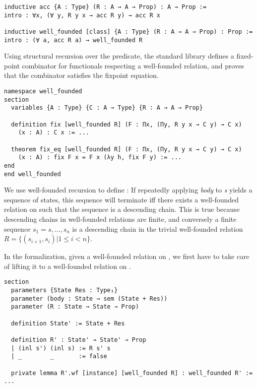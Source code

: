 \begin{verbatim}
inductive acc {A : Type} (R : A → A → Prop) : A → Prop :=
intro : ∀x, (∀ y, R y x → acc R y) → acc R x

inductive well_founded [class] {A : Type} (R : A → A → Prop) : Prop :=
intro : (∀ a, acc R a) → well_founded R
\end{verbatim}

Using structural recursion over the  predicate, the standard library
defines a fixed-point combinator for functionals respecting a well-founded
relation, and proves that the combinator satisfies the fixpoint equation.

\begin{verbatim}
namespace well_founded
section
  variables {A : Type} {C : A → Type} {R : A → A → Prop}

  definition fix [well_founded R] (F : Πx, (Πy, R y x → C y) → C x)
    (x : A) : C x := ...

  theorem fix_eq [well_founded R] (F : Πx, (Πy, R y x → C y) → C x)
    (x : A) : fix F x = F x (λy h, fix F y) := ...
end
end well_founded
\end{verbatim}

We use well-founded recursion to define : If repeatedly applying
\emph{body} to \emph{s} yields a sequence of states,
this sequence will terminate iff there exists a well-founded relation on
 such that the sequence is a descending chain.
This is true because descending chains in well-founded relations are finite, and
conversely a finite sequence $s_1 = s, \dots, s_n$ is a descending chain in the
trivial well-founded relation $R = \{(s_{i+1}, s_i) | 1 \le i < n\}$.

In the formalization, given a well-founded relation  on , we first have to take care of lifting it to a well-founded relation  on .

\begin{verbatim}
section
  parameters {State Res : Type₁}
  parameter (body : State → sem (State + Res))
  parameter (R : State → State → Prop)

  definition State' := State + Res

  definition R' : State' → State' → Prop
  | (inl s') (inl s) := R s' s
  | _        _       := false

  private lemma R'.wf [instance] [well_founded R] : well_founded R' := ...
\end{verbatim}

